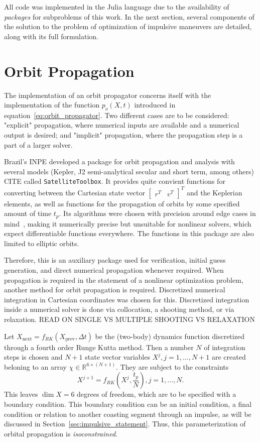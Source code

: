 
All code was implemented in the Julia language due to the availability of \textit{packages} for subproblems of this work. In the next section, several components of the solution to the problem of optimization of impulsive maneuvers are detailed, along with its full formulation.

\section{Orbit Propagation}\label{sec:orbit_propagation}

The implementation of an orbit propagator concerns itself with the implementation of the function \(p_o(X, t)\) introduced in equation~\eqref{eq:orbit_propagator}. Two different cases are to be considered: "explicit" propagation, where numerical inputs are available and a numerical output is desired; and "implicit" propagation, where the propagation step is a part of a larger solver.

Brazil's INPE developed a package for orbit propagation and analysis with several models (Kepler, J2 semi-analytical secular and short term, among others) CITE called \texttt{SatelliteToolbox}. It provides quite convient functions for converting between the Cartesian state vector \(\begin{bmatrix}
    r^T & v^T
\end{bmatrix}^T\) and the Keplerian elements, as well as functions for the propagation of orbits by some specified amount of time \(t_p\). Its algorithms were chosen with precision around edge cases in mind~\cite{rv_to_kepler}, making it numerically precise but unsuitable for nonlinear solvers, which expect differentiable functions everywhere. The functions in this package are also limited to elliptic orbits.

Therefore, this is an auxiliary package used for verification, initial guess generation, and direct numerical propagation whenever required. When propagation is required in the statement of a nonlinear optimization problem, another method for orbit propagation is required. Discretized numerical integration in Cartesian coordinates was chosen for this. Discretized integration inside a numerical solver is done via collocation, a shooting method, or via relaxation. READ ON SINGLE VS MULTIPLE SHOOTING VS RELAXATION

Let \(X_{\text{next}} = f_{RK}(X_{\text{prev}}, \Delta t)\) be the (two-body) dynamics function discretized through a fourth order Runge Kutta method. Then a number \(N\) of integration steps is chosen and \(N+1\) state vector variables \(X^j, j=1,\dots,N+1\) are created beloning to an array \(\chi \in \mathbb{R}^{6 \times (N+1)}\). They are subject to the constraints
\begin{equation}
    X^{j+1} = f_{RK}(X^j, \frac{t_p}{N}), j = 1, \dots, N.
\end{equation}
This leaves \(\dim X = 6\) degrees of freedom, which are to be specified with a boundary condition. This boundary condition can be an initial condition, a final condition or relation to another coasting segment through an impulse, as will be discussed in Section~\ref{sec:impulsive_statement}. Thus, this parameterization of orbital propagation is \textit{isoconstrained}.

